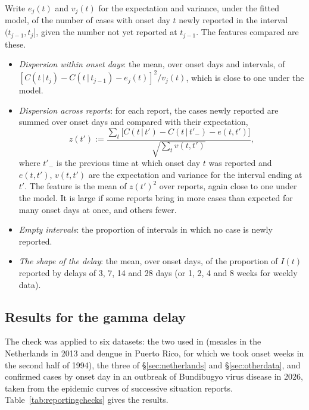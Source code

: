 \documentclass[11pt,a4paper]{article}
\newcommand{\given}{\,|\,}
\begin{document}
Write $e_j(t)$ and $v_j(t)$ for the expectation and variance, under the fitted
model, of the number of cases with onset day $t$ newly reported in the
interval $(t_{j-1},t_j]$, given the number not yet reported at $t_{j-1}$. The
features compared are these.
\begin{itemize}[itemsep=2pt]
\item \emph{Dispersion within onset days}: the mean, over onset days and
intervals, of $[C(t\given t_j)-C(t\given t_{j-1})-e_j(t)]^2/v_j(t)$, which is
close to one under the model.
\item \emph{Dispersion across reports}: for each report, the cases newly
reported are summed over onset days and compared with their expectation,
\begin{equation}\label{eq:zreport}
z(t') := \frac{\sum_{t}\bigl[C(t\given t')-C(t\given t'_{-})-e(t,t')\bigr]}
{\sqrt{\sum_{t}v(t,t')}},
\end{equation}
where $t'_{-}$ is the previous time at which onset day $t$ was reported and
$e(t,t')$, $v(t,t')$ are the expectation and variance for the interval ending
at $t'$. The feature is the mean of $z(t')^2$ over reports, again close to one
under the model. It is large if some reports bring in more cases than expected
for many onset days at once, and others fewer.
\item \emph{Empty intervals}: the proportion of intervals in which no case is
newly reported.
\item \emph{The shape of the delay}: the mean, over onset days, of the
proportion of $I(t)$ reported by delays of 3, 7, 14 and 28 days (or 1, 2, 4
and 8 weeks for weekly data).
\end{itemize}

\subsection{Results for the gamma delay}

The check was applied to six datasets: the two used in \cite{bajaj2025}
(measles in the Netherlands in 2013 and dengue in Puerto Rico, for which we
took onset weeks in the second half of 1994), the three of
\S\ref{sec:netherlands} and \S\ref{sec:otherdata}, and confirmed cases by
onset day in an outbreak of Bundibugyo virus disease in 2026, taken from the
epidemic curves of successive situation reports. Table~\ref{tab:reportingchecks}
gives the results.
\end{document}
